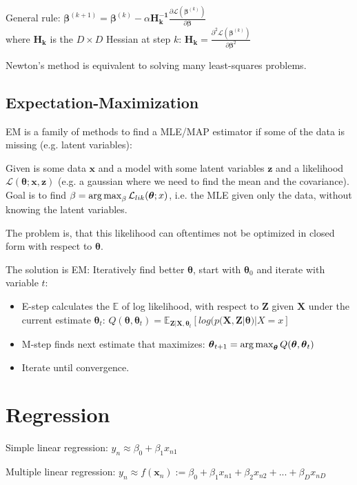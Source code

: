 \documentclass[10pt,a4paper,landscape]{article}
\renewcommand{\bf}[1]{\ensuremath{\mathbf{#1}}}
\newcommand{\bbeta}{\boldsymbol\beta}
\newcommand{\btheta}{\boldsymbol\theta}
\begin{document}
\begin{multicols*}{4}
General rule: $\bbeta^{(k+1)} = \bbeta^{(k)} - \alpha \bf{H_k^{-1}} \frac{\partial \mathcal{L}(\bbeta^{(k)})}{\partial \bbeta}$\\
where $\bf{H_k}$ is the $D \times D$ Hessian at step $k$: $\bf{H_k} = \frac{\partial^2 \mathcal{L}(\bbeta^{(k)})}{\partial \bbeta^2}$

Newton's method is equivalent to solving many least-squares problems.


\subsection{Expectation-Maximization}
EM is a family of methods to find a MLE/MAP estimator if some of the data is missing (e.g. latent variables):

Given is some data $\bf{x}$ and  a model with some latent variables $\bf{z}$ and a likelihood $\mathcal{L}(\btheta; \bf{x}, \bf{z})$ (e.g. a gaussian where we need to find the mean and the covariance).
Goal is to find $\beta = \argmax_{\beta} \mathcal{L}_{lik}(\btheta; x)$, i.e. the MLE given only the data, without knowing the latent variables.

The problem is, that this likelihood can oftentimes not be optimized in closed form with respect to $\btheta$.

The solution is EM: Iteratively find better $\btheta$, start with $\btheta_0$ and iterate with variable $t$:
\begin{itemize}
\item E-step calculates the $\mathbb{E}$ of log likelihood, with respect to $\bf{Z}$ given $\bf{X}$ under the current estimate $\btheta_t$: $Q(\btheta, \btheta_t) = \mathbb{E}_{\bf{Z}|\bf{X},\btheta_t} [ log ( p(\bf{X}, \bf{Z} | \btheta) | X = x ]$
\item M-step finds next estimate that maximizes: $\btheta_{t+1} = \argmax_{\btheta} Q(\btheta, \btheta_t)$
\item Iterate until convergence.
\end{itemize}

\section{Regression}
Simple linear regression: $y_n \approx \beta_0 + \beta_1 x_{n1}$

Multiple linear regression: $y_n \approx f(\bf{x}_n) := \beta_0 + \beta_1 x_{n1} + \beta_2 x_{n2} + ... + \beta_D x_{nD}$


\end{multicols*}
\end{document}
